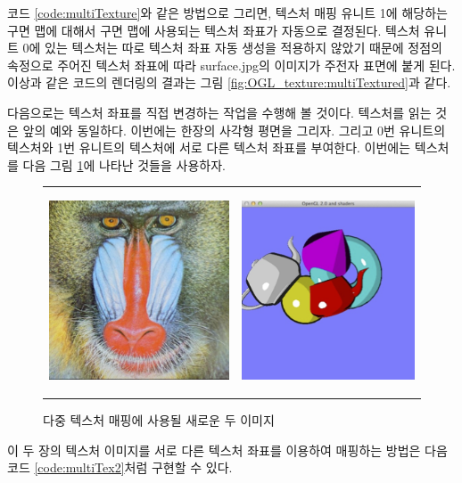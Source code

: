 코드 \ref{code:multiTexture}와 같은 방법으로 그리면, 텍스처 매핑 유니트 1에 해당하는 구면 맵에 대해서 구면 맵에 사용되는 텍스처 좌표가 자동으로 결정된다. 텍스처 유니트 0에 있는 텍스처는 따로 텍스처 좌표 자동 생성을 적용하지 않았기 때문에 정점의 속정으로 주어진 텍스처 좌표에 따라 {\sf surface.jpg}의 이미지가 주전자 표면에 붙게 된다.
이상과 같은 코드의 렌더링의 결과는 그림 \ref{fig:OGL_texture:multiTextured}과 같다.



다음으로는 텍스처 좌표를 직접 변경하는 작업을 수행해 볼 것이다.
텍스처를 읽는 것은 앞의 예와 동일하다. 이번에는 한장의 사각형 평면을 그리자. 그리고 0번 유니트의 텍스처와 1번 유니트의 텍스처에 서로 다른 텍스처 좌표를 부여한다.
이번에는 텍스처를 다음 그림 \ref{fig:OGL_texture:multiTex2}에 나타난 것들을 사용하자.

\begin{figure}[h!]
  \centering
	\begin{tabular}{cc}
	\includegraphics[height=6cm]{OGL_texture/multiTex2A.png} &
	\includegraphics[height=6cm]{OGL_texture/multiTex2B.png}  \\
	\end{tabular}
    \caption{다중 텍스처 매핑에 사용될 새로운 두 이미지}
    \label{fig:OGL_texture:multiTex2}
\end{figure}

이 두 장의 텍스처 이미지를 서로 다른 텍스처 좌표를 이용하여 매핑하는 방법은 다음 코드
\ref{code:multiTex2}처럼 구현할 수 있다.

